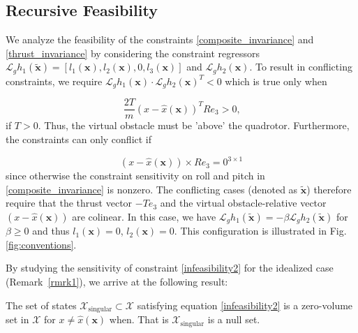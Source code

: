 \subsection{Recursive Feasibility}

We analyze the feasibility of the constraints \eqref{composite_invariance} and \eqref{thrust_invariance} by considering the constraint regressors $\mathcal{L}_g h_1(\tilde{\mathbf{x}}) = [l_1(\mathbf{x}), l_2(\mathbf{x}), 0, l_3(\mathbf{x})]$ and $\mathcal{L}_g h_2(\mathbf{x})$. To result in conflicting constraints, we require $\mathcal{L}_g h_1(\mathbf{x}) \cdot \mathcal{L}_g h_2(\mathbf{x})^T <0$ which is true only when 

\small
\begin{equation}\label{infeasibility1}
    \frac{2T}{m}(x- \hat{x}(\mathbf{x}))^T R e_3 >0 \text{,}
\end{equation}
\normalsize
if $T > 0$. Thus, the virtual obstacle must be 'above' the quadrotor. Furthermore, the constraints can only conflict if

\small
\begin{equation}\label{infeasibility2}
    (x- \hat{x}(\mathbf{x})) \times R e_3 = 0^{3 \times 1}
\end{equation}
\normalsize
since otherwise the constraint sensitivity on roll and pitch in \eqref{composite_invariance} is nonzero. The conflicting cases (denoted as $\tilde{\mathbf{x}}$) therefore require that the thrust vector $-T e_3$ and the virtual obstacle-relative vector $(x- \hat{x}(\mathbf{x}))$ are colinear. In this case, we have $\mathcal{L}_g h_1(\tilde{\mathbf{x}}) = -\beta \mathcal{L}_g h_2(\tilde{\mathbf{x}})$ for $\beta\geq 0$ and thus $l_1(\mathbf{x})=0$, $l_2(\mathbf{x})=0$. This configuration is illustrated in Fig. \ref{fig:conventions}.


By studying the sensitivity of constraint \eqref{infeasibility2} for the idealized case (Remark~\ref{rmrk1}), we arrive at the following result:
\begin{proposition}
    The set of states $\mathcal{X}_\text{singular} \subset \mathcal{X}$ satisfying equation \eqref{infeasibility2} is a zero-volume set in $\mathcal{X}$ for $x \neq \hat{x}(\mathbf{x})$ when. That is $\mathcal{X}_\text{singular}$ is a null set.
\end{proposition}

